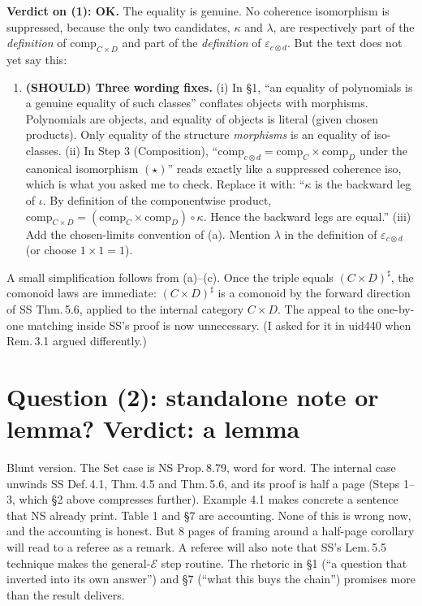 \documentclass[10pt]{amsart}
\newcommand{\E}{\mathcal{E}}
\begin{document}
\textbf{Verdict on (1): OK.} The equality is genuine. No coherence isomorphism is suppressed, because the only two
candidates, $\kappa$ and $\lambda$, are respectively part of the \emph{definition} of $\mathrm{comp}_{C\times D}$
and part of the \emph{definition} of $\varepsilon_{c\otimes d}$. But the text does not yet say this:
\begin{enumerate}[label=\textbf{S-A.},leftmargin=*]
\item \textbf{(SHOULD) Three wording fixes.}
  (i) In \S1, ``an equality of polynomials is a genuine equality of such classes'' conflates objects with morphisms.
  Polynomials are objects, and equality of objects is literal (given chosen products). Only equality of the structure
  \emph{morphisms} is an equality of iso-classes.
  (ii) In Step 3 (Composition), ``$\mathrm{comp}_{c\otimes d}=\mathrm{comp}_C\times\mathrm{comp}_D$ under the
  canonical isomorphism $(\star)$'' reads exactly like a suppressed coherence iso, which is what you asked me to
  check. Replace it with: ``$\kappa$ is the backward leg of $\iota$. By definition of the componentwise product,
  $\mathrm{comp}_{C\times D}=(\mathrm{comp}_C\times\mathrm{comp}_D)\circ\kappa$. Hence the backward legs are equal.''
  (iii) Add the chosen-limits convention of (a). Mention $\lambda$ in the definition of $\varepsilon_{c\otimes d}$
  (or choose $1\times1=1$).
\end{enumerate}
A small simplification follows from (a)--(c). Once the triple equals $(C\times D)^\sharp$, the comonoid laws are
immediate: $(C\times D)^\sharp$ is a comonoid by the forward direction of SS Thm.\,5.6, applied to the internal
category $C\times D$. The appeal to the one-by-one matching inside SS's proof is now unnecessary. (I asked for it in
uid440 when Rem.\,3.1 argued differently.)

\section{Question (2): standalone note or lemma? Verdict: a lemma}

Blunt version. The Set case is NS Prop.\,8.79, word for word. The internal case unwinds SS Def.\,4.1, Thm.\,4.5 and
Thm.\,5.6, and its proof is half a page (Steps 1--3, which \S2 above compresses further). Example 4.1 makes concrete
a sentence that NS already print. Table 1 and \S7 are accounting. None of this is wrong now, and the accounting is
honest. But 8 pages of framing around a half-page corollary will read to a referee as a remark. A referee will also
note that SS's Lem.\,5.5 technique makes the general-$\E$ step routine. The rhetoric in \S1 (``a question that
inverted into its own answer'') and \S7 (``what this buys the chain'') promises more than the result delivers.
\end{document}
